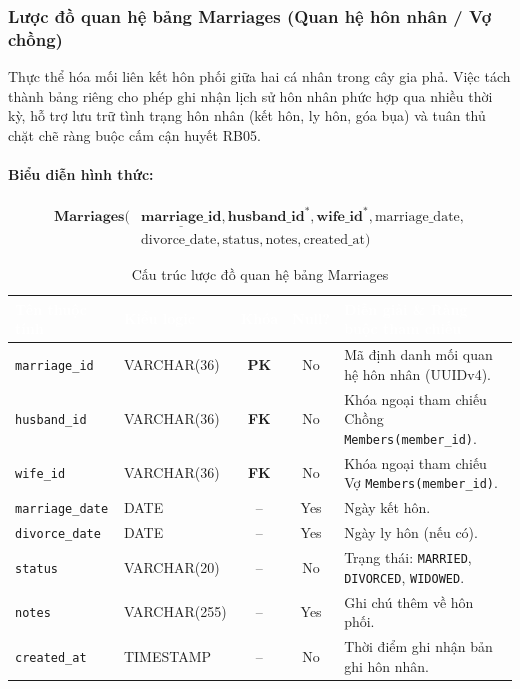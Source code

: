 \subsubsection{Lược đồ quan hệ bảng Marriages (Quan hệ hôn nhân / Vợ chồng)}
Thực thể hóa mối liên kết hôn phối giữa hai cá nhân trong cây gia phả. Việc tách thành bảng riêng cho phép ghi nhận lịch sử hôn nhân phức hợp qua nhiều thời kỳ, hỗ trợ lưu trữ tình trạng hôn nhân (kết hôn, ly hôn, góa bụa) và tuân thủ chặt chẽ ràng buộc cấm cận huyết RB05.

\paragraph{Biểu diễn hình thức:}
\[
\begin{aligned}
\textbf{Marriages}\big(
&\underline{\textbf{marriage\_id}}, \textbf{husband\_id}^*, \textbf{wife\_id}^*, \text{marriage\_date}, \\
&\text{divorce\_date}, \text{status}, \text{notes}, \text{created\_at}
\big)
\end{aligned}
\]

\begin{table}[H]
    \centering
    \small
    \renewcommand{\arraystretch}{1.2}
    \begin{tabularx}{\textwidth}{p{3.2cm} p{2.6cm} c c X}
        \toprule
        \rowcolor{tableheader}\textcolor{white}{\textbf{Tên thuộc tính}} & \textcolor{white}{\textbf{Kiểu logic}} & \textcolor{white}{\textbf{Khóa}} & \textcolor{white}{\textbf{Null?}} & \textcolor{white}{\textbf{Diễn giải \& Ràng buộc tham chiếu}} \\
        \midrule
        \rowcolor{tablerowalt}
        \texttt{marriage\_id} & VARCHAR(36) & \textcolor{pkcolor}{\textbf{PK}} & No & Mã định danh mối quan hệ hôn nhân (UUIDv4). \\
        \texttt{husband\_id} & VARCHAR(36) & \textcolor{fkcolor}{\textbf{FK}} & No & Khóa ngoại tham chiếu Chồng \texttt{Members(member\_id)}. \\
        \rowcolor{tablerowalt}
        \texttt{wife\_id} & VARCHAR(36) & \textcolor{fkcolor}{\textbf{FK}} & No & Khóa ngoại tham chiếu Vợ \texttt{Members(member\_id)}. \\
        \texttt{marriage\_date} & DATE & -- & Yes & Ngày kết hôn. \\
        \rowcolor{tablerowalt}
        \texttt{divorce\_date} & DATE & -- & Yes & Ngày ly hôn (nếu có). \\
        \texttt{status} & VARCHAR(20) & -- & No & Trạng thái: \texttt{MARRIED}, \texttt{DIVORCED}, \texttt{WIDOWED}. \\
        \rowcolor{tablerowalt}
        \texttt{notes} & VARCHAR(255) & -- & Yes & Ghi chú thêm về hôn phối. \\
        \texttt{created\_at} & TIMESTAMP & -- & No & Thời điểm ghi nhận bản ghi hôn nhân. \\
        \bottomrule
    \end{tabularx}
    \caption{Cấu trúc lược đồ quan hệ bảng Marriages}
    \label{tab:schema_marriages}
\end{table}

